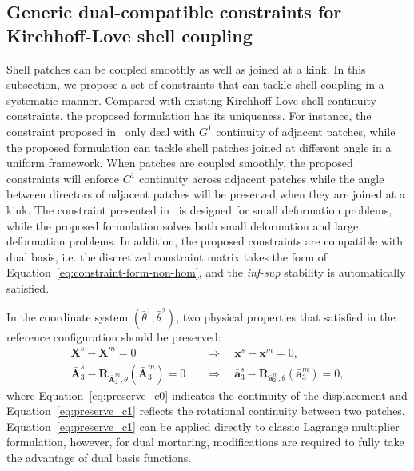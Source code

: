 \subsection{Generic dual-compatible constraints for Kirchhoff-Love shell coupling}

Shell patches can be coupled smoothly as well as joined at a kink. In this subsection, we propose a set of constraints that can tackle shell coupling in a systematic manner. Compared with existing Kirchhoff-Love shell continuity constraints, the proposed formulation has its uniqueness. For instance, the constraint proposed in~\cite{schuss2019multi} only deal with $G^1$ continuity of adjacent patches, while the proposed formulation can tackle shell patches joined at different angle in a uniform framework. When patches are coupled smoothly, the proposed constraints will enforce $C^1$ continuity across adjacent patches while the angle between directors of adjacent patches will be preserved when they are joined at a kink. The constraint presented in~\cite{coox_robust_2017, hirschler2019embedded} is designed for small deformation problems, while the proposed formulation solves both small deformation and large deformation problems. In addition, the proposed constraints are compatible with dual basis, i.e. the discretized constraint matrix takes the form of Equation~\eqref{eq:constraint-form-non-hom}, and the \textit{inf-sup} stability is automatically satisfied.\par

In the coordinate system $(\bar{\theta}^1, \bar{\theta}^2)$, two physical properties that satisfied in the reference configuration should be preserved:
\begin{subequations}
	\begin{align}
		\mathbf{X}^s-\mathbf{X}^m=0\quad                                                              & \Rightarrow\quad \mathbf{x}^s-\mathbf{x}^m=0,\label{eq:preserve_c0}                                                               \\
		\bar{\mathbf{A}}^s_3 - \mathbf{R}_{\bar{\mathbf{A}}^m_2,\theta}(\bar{\mathbf{A}}^m_3)=0 \quad & \Rightarrow\quad \bar{\mathbf{a}}^s_3 - \mathbf{R}_{\bar{\mathbf{a}}^m_2,\theta}(\bar{\mathbf{a}}^m_3) = 0,\label{eq:preserve_c1}
	\end{align}
\end{subequations}
where Equation~\eqref{eq:preserve_c0} indicates the continuity of the displacement and Equation~\eqref{eq:preserve_c1} reflects the rotational continuity between two patches. Equation~\eqref{eq:preserve_c1} can be applied directly to classic Lagrange multiplier formulation, however, for dual mortaring, modifications are required to fully take the advantage of dual basis functions.\par

